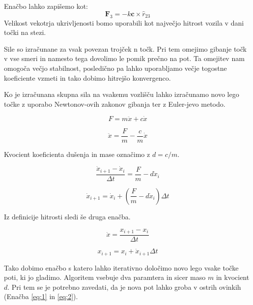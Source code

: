 \documentclass[10pt,a4paper]{article}
\begin{document}
Enačbo lahko zapišemo kot:
\begin{equation}
\mathbf{F}_3 = -k \mathbf{c} \times \hat{r}_{23}
\end{equation}
Velikost vekotrja ukrivljenosti bomo uporabili kot največjo hitrost vozila v dani točki na stezi.

Sile so izračunane za vsak povezan trojček n točk. Pri tem omejimo gibanje točk v vse smeri in namesto tega dovolimo le pomik prečno na pot. Ta omejitev nam omogoča večjo stabilnost, posledično pa lahko uporabljamo večje togostne koeficiente vzmeti in tako dobimo hitrejšo konvergenco.

Ko je izračunana skupna sila na vsakemu vozlišču lahko izračunamo novo lego točke z uporabo Newtonov-ovih zakonov gibanja ter z Euler-jevo metodo.

\begin{equation}
F = m \ddot{x} + c \dot{x}
\end{equation}

\begin{equation}
\ddot{x} = \frac{F}{m} - \frac{c}{m} \dot{x}
\end{equation}

Kvocient koeficienta dušenja in mase označimo z $d = c / m$.

\begin{equation}
\frac{\dot{x}_{i+1} - \dot{x}_i}{\Delta t} = \frac{F}{m} - d \dot{x}_i
\end{equation}

\begin{equation}
\dot{x}_{i+1} = \dot{x}_i + (\frac{F}{m} - d \dot{x}_i)\Delta t
\end{equation}

Iz definicije hitrosti sledi še druga enačba.

\begin{equation}
\dot{x} = \frac{x_{i+1} - x_i}{\Delta t}
\end{equation}

\begin{equation} \label{eq:16}
x_{i + 1} = x_{i} + \dot{x}_{i + 1} \Delta t 
\end{equation}

Tako dobimo enačbo s katero lahko iterativno določimo novo lego vsake točke poti, ki jo gladimo. Algoritem vsebuje dva paramtera in sicer maso $m$ in kvocient $d$. Pri tem se je potrebno zavedati, da je nova pot lahko groba v ostrih ovinkih (Enačba \ref{eq:1} in \ref{eq:2}).
\end{document}
